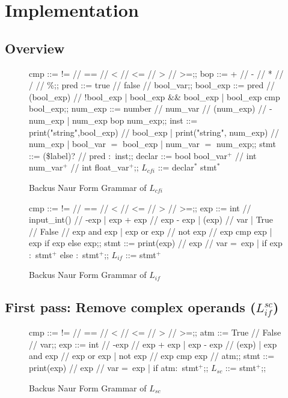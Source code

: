 \section{Implementation}

\subsection{Overview}
\lipsum[1]

\begin{figure}[h]
	\centering
	\begin{bnf}[row{-} = {bg = gray9}]
		cmp ::= != // == // < // <= // > // >=;;
		bop ::= + // - // * // / // \%;;
		pred ::= true // false // bool\_var;;
		bool\_exp ::= pred // (bool\_exp) // !bool\_exp
		| bool\_exp \&\& bool\_exp
		| bool\_exp cmp bool\_exp;;
		num\_exp ::= number // num\_var // (num\_exp) // -num\_exp
		| num\_exp bop num\_exp;;
		inst ::= print("string",bool\_exp) // bool\_exp
		| print("string", num\_exp) // num\_exp
		| bool\_var $=$ bool\_exp
		| num\_var $=$ num\_exp;;
		stmt ::= (\$label)? // pred $\colon$ inst;;
		declar ::= bool bool\_var$^+$ // int num\_var$^+$ // int float\_var$^+$;;
		$L_{cfi}$ ::= declar$^*$ stmt$^*$
	\end{bnf}
	\caption{Backus Naur Form Grammar of $L_{cfi}$}
	\label{lcfi}
\end{figure}

\begin{figure}[h]
	\centering
	\begin{bnf}[row{-} = {bg = gray9}]
		cmp ::= != // == // < // <= // > // >=;;
		exp ::= int // input\_int() // -exp
		| exp + exp // exp - exp
		| (exp) // var
		| True // False // exp and exp
		| exp or exp // not exp // exp cmp exp
		| exp if exp else exp;;
		stmt ::= print(exp) // exp // var = exp
		| if exp $\colon$ stmt$^+$ else $\colon$ stmt$^+$;;
		$L_{if}$ ::= stmt$^+$
	\end{bnf}
	\caption{Backus Naur Form Grammar of $L_{if}$}
	\label{lif}
\end{figure}

\subsection{First pass: Remove complex operands ($L_{if}^{sc}$)}

\begin{figure}[h!]
	\centering
	\begin{bnf}[row{-} = {bg = gray9}]
		cmp ::= != // == // < // <= // > // >=;;
		atm ::= True // False // var;;
		exp ::= int  // -exp // exp + exp 
		| exp - exp // (exp)
		| exp and exp // exp or exp 
		| not exp // exp cmp exp // atm;;
		stmt ::= print(exp) // exp // var = exp
		| if atm$\colon$ stmt$^+$;;
		$L_{sc}$ ::= stmt$^+$;;
	\end{bnf}
	\caption{Backus Naur Form Grammar of $L_{sc}$}
	\label{bnf:sc}
\end{figure}

